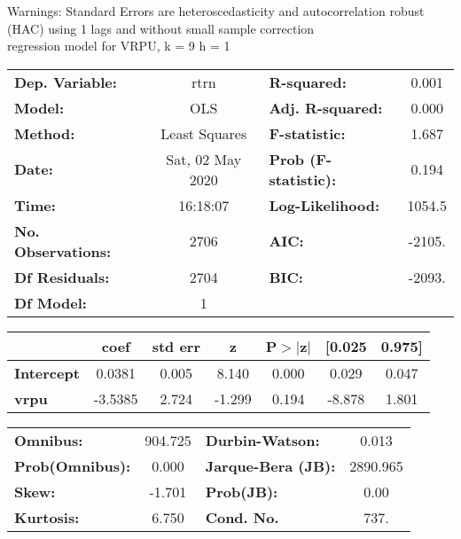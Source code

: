 Warnings: \newline
 [1] Standard Errors are heteroscedasticity and autocorrelation robust (HAC) using 1 lags and without small sample correction\\ 

regression model for VRPU, k = 9 h = 1\begin{center}
\begin{tabular}{lclc}
\toprule
\textbf{Dep. Variable:}    &       rtrn       & \textbf{  R-squared:         } &     0.001   \\
\textbf{Model:}            &       OLS        & \textbf{  Adj. R-squared:    } &     0.000   \\
\textbf{Method:}           &  Least Squares   & \textbf{  F-statistic:       } &     1.687   \\
\textbf{Date:}             & Sat, 02 May 2020 & \textbf{  Prob (F-statistic):} &    0.194    \\
\textbf{Time:}             &     16:18:07     & \textbf{  Log-Likelihood:    } &    1054.5   \\
\textbf{No. Observations:} &        2706      & \textbf{  AIC:               } &    -2105.   \\
\textbf{Df Residuals:}     &        2704      & \textbf{  BIC:               } &    -2093.   \\
\textbf{Df Model:}         &           1      & \textbf{                     } &             \\
\bottomrule
\end{tabular}
\begin{tabular}{lcccccc}
                   & \textbf{coef} & \textbf{std err} & \textbf{z} & \textbf{P$> |$z$|$} & \textbf{[0.025} & \textbf{0.975]}  \\
\midrule
\textbf{Intercept} &       0.0381  &        0.005     &     8.140  &         0.000        &        0.029    &        0.047     \\
\textbf{vrpu}      &      -3.5385  &        2.724     &    -1.299  &         0.194        &       -8.878    &        1.801     \\
\bottomrule
\end{tabular}
\begin{tabular}{lclc}
\textbf{Omnibus:}       & 904.725 & \textbf{  Durbin-Watson:     } &    0.013  \\
\textbf{Prob(Omnibus):} &   0.000 & \textbf{  Jarque-Bera (JB):  } & 2890.965  \\
\textbf{Skew:}          &  -1.701 & \textbf{  Prob(JB):          } &     0.00  \\
\textbf{Kurtosis:}      &   6.750 & \textbf{  Cond. No.          } &     737.  \\
\bottomrule
\end{tabular}
\end{center}

